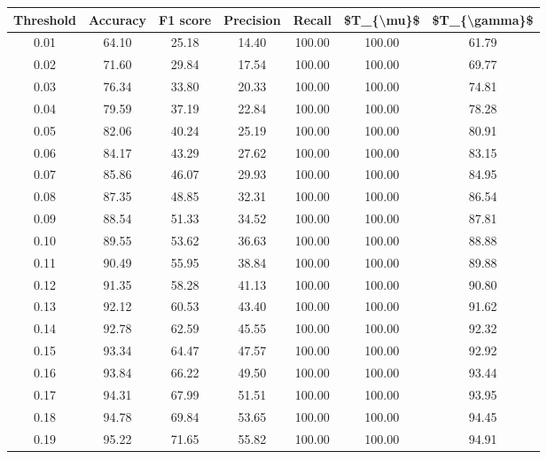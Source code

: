 \begin{tabular}{|c|c|c|c|c|c|c|}
\hline
 Threshold &  Accuracy &  F1 score &  Precision &  Recall &  \$T\_\{\textbackslash mu\}\$ &  \$T\_\{\textbackslash gamma\}\$ \\
\hline
      0.01 &     64.10 &     25.18 &      14.40 &  100.00 &     100.00 &         61.79 \\
      0.02 &     71.60 &     29.84 &      17.54 &  100.00 &     100.00 &         69.77 \\
      0.03 &     76.34 &     33.80 &      20.33 &  100.00 &     100.00 &         74.81 \\
      0.04 &     79.59 &     37.19 &      22.84 &  100.00 &     100.00 &         78.28 \\
      0.05 &     82.06 &     40.24 &      25.19 &  100.00 &     100.00 &         80.91 \\
      0.06 &     84.17 &     43.29 &      27.62 &  100.00 &     100.00 &         83.15 \\
      0.07 &     85.86 &     46.07 &      29.93 &  100.00 &     100.00 &         84.95 \\
      0.08 &     87.35 &     48.85 &      32.31 &  100.00 &     100.00 &         86.54 \\
      0.09 &     88.54 &     51.33 &      34.52 &  100.00 &     100.00 &         87.81 \\
      0.10 &     89.55 &     53.62 &      36.63 &  100.00 &     100.00 &         88.88 \\
      0.11 &     90.49 &     55.95 &      38.84 &  100.00 &     100.00 &         89.88 \\
      0.12 &     91.35 &     58.28 &      41.13 &  100.00 &     100.00 &         90.80 \\
      0.13 &     92.12 &     60.53 &      43.40 &  100.00 &     100.00 &         91.62 \\
      0.14 &     92.78 &     62.59 &      45.55 &  100.00 &     100.00 &         92.32 \\
      0.15 &     93.34 &     64.47 &      47.57 &  100.00 &     100.00 &         92.92 \\
      0.16 &     93.84 &     66.22 &      49.50 &  100.00 &     100.00 &         93.44 \\
      0.17 &     94.31 &     67.99 &      51.51 &  100.00 &     100.00 &         93.95 \\
      0.18 &     94.78 &     69.84 &      53.65 &  100.00 &     100.00 &         94.45 \\
      0.19 &     95.22 &     71.65 &      55.82 &  100.00 &     100.00 &         94.91 \\

\end{tabular}
